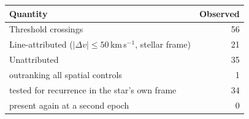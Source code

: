 \begin{tabular}{@{}lr@{}}
\hline
Quantity & Observed \\
\hline
Threshold crossings & 56 \\
Line-attributed ($|\Delta v|\leq50$\,km\,s$^{-1}$, stellar frame) & 21 \\
Unattributed & 35 \\
\quad outranking all spatial controls & 1 \\
\quad tested for recurrence in the star's own frame & 34 \\
\quad present again at a second epoch & 0 \\
\hline
\end{tabular}
